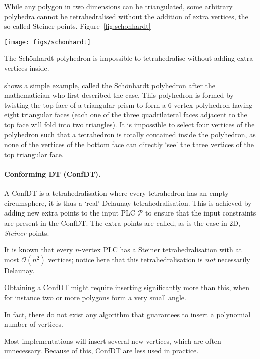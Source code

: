 While any polygon in two dimensions can be triangulated, some arbitrary polyhedra cannot be tetrahedralised without the addition of extra vertices, the so-called Steiner points. 
Figure~\ref{fig:schonhardt}
\begin{marginfigure}
  \centering
  \texttt{[image: figs/schonhardt]}
  \caption{The Schönhardt polyhedron is impossible to tetrahedralise without adding extra vertices inside.}%
\label{fig:schonhardt}
\end{marginfigure}
shows a simple example, called the Schönhardt polyhedron after the mathematician who first described the case.
This polyhedron is formed by twisting the top face of a triangular prism to form a 6-vertex polyhedron having eight triangular faces (each one of the three quadrilateral faces adjacent to the top face will fold into two triangles). 
It is impossible to select four vertices of the polyhedron such that a tetrahedron is totally contained inside the polyhedron, as none of the vertices of the bottom face can directly `see' the three vertices of the top triangular face.



\paragraph*{Conforming DT (ConfDT).}

A ConfDT is a tetrahedralisation where every tetrahedron has an empty circumsphere, it is thus a `real' Delaunay tetrahedralisation.   
This is achieved by adding new extra points to the input PLC $\mathcal{P}$ to ensure that the input constraints are present in the ConfDT\@. 
The extra points are called, as is the case in 2D, \emph{Steiner} points.

% 

It is known that every $n$-vertex PLC has a Steiner tetrahedralisation with at most $\mathcal{O}(n^2)$ vertices; notice here that this tetrahedralisation is \emph{not} necessarily Delaunay.

Obtaining a ConfDT might require inserting significantly more than this, when for instance two or more polygons form a very small angle.

In fact, there do not exist any algorithm that guarantees to insert a polynomial number of vertices.

Most implementations will insert several new vertices, which are often unnecessary.
Because of this, ConfDT are less used in practice.


